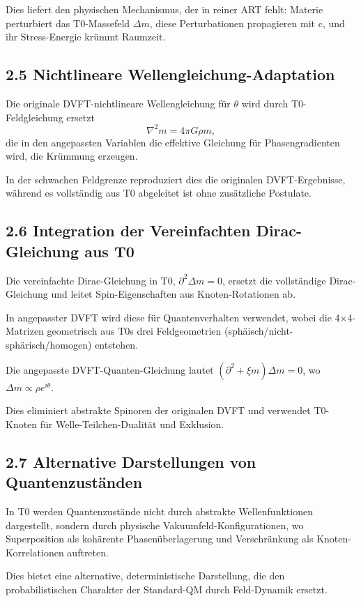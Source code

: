 \documentclass[12pt,a4paper]{article}
\begin{document}
	Dies liefert den physischen Mechanismus, der in reiner ART fehlt: Materie perturbiert das T0-Massefeld $\Delta m$, diese Perturbationen propagieren mit c, und ihr Stress-Energie krümmt Raumzeit.
	
	\subsection{2.5 Nichtlineare Wellengleichung-Adaptation}
	
	Die originale DVFT-nichtlineare Wellengleichung für $\theta$ wird durch T0-Feldgleichung ersetzt
	\[
	\nabla^2 m = 4\pi G \rho m,
	\]
	die in den angepassten Variablen die effektive Gleichung für Phasengradienten wird, die Krümmung erzeugen.
	
	In der schwachen Feldgrenze reproduziert dies die originalen DVFT-Ergebnisse, während es vollständig aus T0 abgeleitet ist ohne zusätzliche Postulate.
	
	\subsection{2.6 Integration der Vereinfachten Dirac-Gleichung aus T0}
	
	Die vereinfachte Dirac-Gleichung in T0, $\partial^2 \Delta m = 0$, ersetzt die vollständige Dirac-Gleichung und leitet Spin-Eigenschaften aus Knoten-Rotationen ab.
	
	In angepasster DVFT wird diese für Quantenverhalten verwendet, wobei die 4×4-Matrizen geometrisch aus T0s drei Feldgeometrien (sphäisch/nicht-sphärisch/homogen) entstehen.
	
	Die angepasste DVFT-Quanten-Gleichung lautet $(\partial^2 + \xi m) \Delta m = 0$, wo $\Delta m \propto \rho e^{i\theta}$.
	
	Dies eliminiert abstrakte Spinoren der originalen DVFT und verwendet T0-Knoten für Welle-Teilchen-Dualität und Exklusion.
	
	\subsection{2.7 Alternative Darstellungen von Quantenzuständen}
	
	In T0 werden Quantenzustände nicht durch abstrakte Wellenfunktionen dargestellt, sondern durch physische Vakuumfeld-Konfigurationen, wo Superposition als kohärente Phasenüberlagerung und Verschränkung als Knoten-Korrelationen auftreten.
	
	Dies bietet eine alternative, deterministische Darstellung, die den probabilistischen Charakter der Standard-QM durch Feld-Dynamik ersetzt.
	
\end{document}
